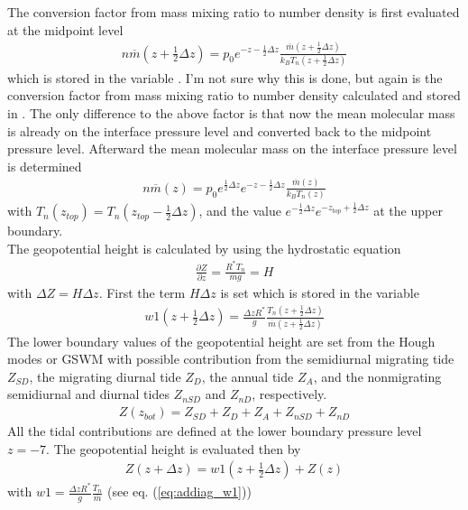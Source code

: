 %
The conversion factor from mass mixing ratio to number density is
first evaluated at the midpoint level
%
\begin{align}
 n \overline{m}(z+\frac{1}{2}\Delta z) = p_0 e^{-z-\frac{1}{2}\Delta z}
 \frac{\overline{m}(z+\frac{1}{2}\Delta z)}{k_B T_n(z+\frac{1}{2}\Delta z)}
\end{align}
%
which is stored in the variable . I'm not sure why this
is done, but again is the conversion factor from mass mixing ratio
to number density calculated and stored in . The only
difference to the above factor is that now the mean molecular mass
is already on the interface pressure level and converted back to the
midpoint pressure level. Afterward the mean molecular mass on the
interface pressure level is determined
%
\begin{align}
 n \overline{m}(z) = p_0 e^{\frac{1}{2}\Delta z} e^{-z-\frac{1}{2}\Delta z}
 \frac{\overline{m}(z)}{k_B T_n(z)}
\end{align}
%
with $T_n(z_{top}) = T_n(z_{top}-\frac{1}{2} \Delta z)$, and the
value $e^{-\frac{1}{2}\Delta z} e^{-z_{top}+\frac{1}{2}\Delta z}$ at
the upper boundary. \\

%
The geopotential height is calculated by using the hydrostatic
equation
%
\begin{align}
   \frac{\partial Z}{\partial z} = \frac{R^* T_n}{\overline{m} g} = H
\end{align}
%
with $\Delta Z = H \Delta z$. First the term $H \Delta z$  is set
which is stored in the variable 
%
\begin{align}
   w1(z+\frac{1}{2} \Delta z) = \frac{\Delta z R^*}{g}\frac{T_n(z+\frac{1}{2} \Delta z) }
   {\overline{m}(z+\frac{1}{2} \Delta z)} \label{eq:addiag_w1}
\end{align}
%
The lower boundary values of the geopotential height are set from
the Hough modes or GSWM with possible contribution from the
semidiurnal migrating tide $Z_{SD}$, the migrating diurnal tide
$Z_D$, the annual tide $Z_A$, and the nonmigrating semidiurnal and
diurnal tides $Z_{nSD}$ and $Z_{nD}$, respectively.
%
\begin{align}
   Z(z_{bot}) = Z_{SD} + Z_{D} + Z_A + Z_{nSD} + Z_{nD}
\end{align}
%
All the tidal contributions are defined at the lower boundary
pressure level $z= -7$. The geopotential height is evaluated then by
%
\begin{align}
   Z(z+ \Delta z) = w1(z+\frac{1}{2} \Delta z) + Z(z)
\end{align}
%
with $w1 = \frac{\Delta z R^*}{g}\frac{T_n }{\overline{m}}$ (see eq.
(\ref{eq:addiag_w1}))
